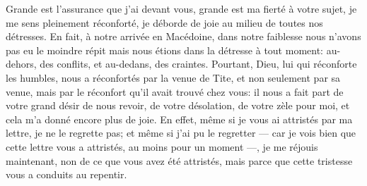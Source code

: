 Grande est l’assurance que j’ai devant vous, grande est ma fierté à votre sujet,
	je me sens pleinement réconforté,
	je déborde de joie au milieu de toutes nos détresses.
En fait, à notre arrivée en Macédoine,
	dans notre faiblesse nous n’avons pas eu le moindre répit
	mais nous étions dans la détresse à tout moment:
	au-dehors, des conflits, et au-dedans, des craintes.
Pourtant, Dieu, lui qui réconforte les humbles,
	nous a réconfortés par la venue de Tite,
	et non seulement par sa venue, mais par le réconfort qu’il avait trouvé chez vous:
	il nous a fait part de votre grand désir de nous revoir,
	de votre désolation, de votre zèle pour moi,
	et cela m’a donné encore plus de joie.
En effet, même si je vous ai attristés par ma lettre, je ne le regrette pas;
	et même si j’ai pu le regretter
	--- car je vois bien que cette lettre vous a attristés, au moins pour un moment ---,
	je me réjouis maintenant, non de ce que vous avez été attristés,
	mais parce que cette tristesse vous a conduits au repentir.
